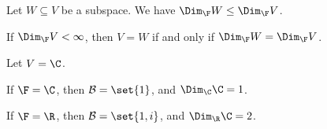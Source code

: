 \documentclass[10pt]{mypackage}
\begin{document}
\begin{corollary}
  Let $W\subseteq V$ be a subspace. We have $\Dim_{\F}W \leq \Dim_{\F} V$.\newline

  If $\Dim_{\F} V < \infty$, then $V = W$ if and only if $\Dim_{\F} W = \Dim_{\F} V$.
\end{corollary}
\begin{example}
  Let $V = \C$.\newline

  If $\F = \C$, then $\mathcal{B} = \set{1}$, and $\Dim_{\C}\C = 1$.\newline

  If $\F = \R$, then $\mathcal{B} = \set{1,i}$, and $\Dim_{\R}\C = 2$.

\end{example}
\end{document}
